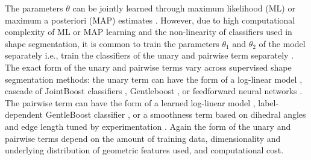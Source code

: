 The parameters $\theta$ can be jointly learned through maximum likelihood (ML) or maximum a posteriori (MAP) estimates \cite{Koller:2009:PGM}. However, due to high computational complexity of ML or MAP learning and the non-linearity of classifiers used in shape segmentation, it is common to train the parameters $\theta_1$ and $\theta_2$ of the model separately i.e., train the classifiers of the unary and pairwise term separately \cite{Sutton:2005:PTU}. The exact form of the unary and pairwise terms vary across supervised shape segmentation methods: the unary term can have the form of a log-linear model \cite{Anguelov:2005:DLM}, cascade of JointBoost classifiers \cite{Kalogerakis:2010:LMS}, Gentleboost \cite{van-Kaick:2011:PKC}, or feedforward neural networks \cite{Zhige:2014:SSL}. The pairwise term can have the form of a learned log-linear model \cite{Anguelov:2005:DLM}, label-dependent GentleBoost classifier \cite{Kalogerakis:2010:LMS}, or a smoothness term based on dihedral angles and edge length tuned by experimentation \cite{Shapira:2010:CPA,van-Kaick:2011:PKC,Zhige:2014:SSL}. Again the form of the unary and pairwise terms depend on the amount of training data, dimensionality and underlying distribution of geometric features used, and computational cost.


